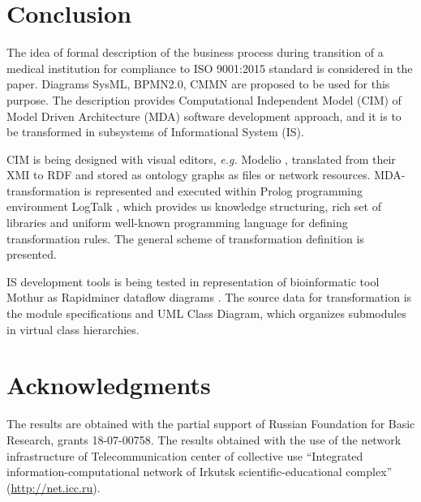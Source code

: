 \documentclass[12pt,a4paper]{llncs}
\begin{document}


\section{Conclusion}

The idea of formal description of the business process during transition of a medical institution for compliance to ISO 9001:2015 standard is considered in the paper.  Diagrams SysML, BPMN2.0, CMMN are proposed to be used for this purpose.  The description provides Computational Independent Model (CIM) of Model Driven Architecture
(MDA) software development approach, and it is to be transformed in subsystems of Informational System (IS).

CIM is being designed with visual editors, \emph{e.g.} Modelio \cite{modelio}, translated from their XMI to RDF and stored as ontology graphs as files or network resources.  MDA-transformation is represented and executed within Prolog programming environment LogTalk \cite{tereh1}, which provides us knowledge structuring, rich set of libraries and uniform well-known programming language for defining transformation rules.  The general scheme of transformation definition is presented.

IS development tools is being tested in representation of bioinformatic tool Mothur as Rapidminer dataflow diagrams \cite{dataflow}.  The source data for transformation is the module specifications and UML Class Diagram, which organizes submodules in virtual class hierarchies.  %

\section{Acknowledgments}
\label{sec:acks}
The results are obtained with the partial support of Russian Foundation for Basic Research, grants 18-07-00758. The results obtained with the use of the network infrastructure of Telecommunication center of collective use ``Integrated information-computational network of Irkutsk scientific-educational complex'' (\url{http://net.icc.ru}).
\end{document}
